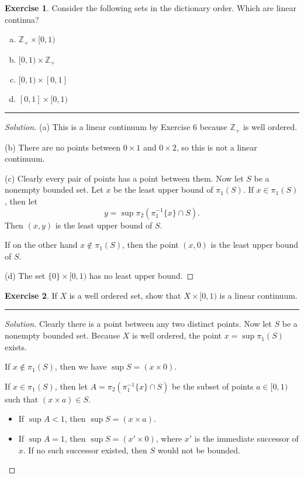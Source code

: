 \documentclass{article}
\theoremstyle{definition}
\newtheorem{exercise}{Exercise}[section]
\begin{document}
\begin{exercise}
  Consider the following sets in the dictionary order. Which are linear continua?
  \begin{enumerate}[(a)]
    \item $\mathbb{Z}_+\times [0,1)$
    \item $[0,1)\times\mathbb{Z}_+$
    \item $[0,1)\times[0,1]$
    \item $[0,1]\times[0,1)$
  \end{enumerate}
\end{exercise}
\hrule
\begin{proof}[Solution]
  (a) This is a linear continuum by Exercise 6 because $\mathbb{Z}_+$ is well ordered.

  (b) There are no points between $0\times 1$ and $0\times 2$, so this is not a linear continuum.

  (c) Clearly every pair of points has a point between them. Now let $S$ be a nonempty bounded set. Let $x$ be the least upper bound of $\pi_1(S)$. If $x\in\pi_1(S)$, then let
  $$y = \sup\pi_2(\pi_1^{-1}\{x\}\cap S).$$
  Then $(x,y)$ is the least upper bound of $S$.

  If on the other hand $x\notin\pi_1(S)$, then the point $(x,0)$ is the least upper bound of $S$.

  (d) The set $\{0\}\times [0,1)$ has no least upper bound.
\end{proof}

\pagebreak

\begin{exercise}
  If $X$ is a well ordered set, show that $X\times [0,1)$ is a linear continuum.
\end{exercise}
\hrule
\begin{proof}[Solution]
  Clearly there is a point between any two distinct points. Now let $S$ be a nonempty bounded set. Because $X$ is well ordered, the point $x = \sup\pi_1(S)$ exists.

  If $x\notin \pi_1(S)$, then we have $\sup S = (x\times 0)$.

  If $x\in\pi_1(S)$, then let $A = \pi_2(\pi_1^{-1}\{x\}\cap S)$ be the subset of points $a\in [0,1)$ such that $(x\times a)\in S$.
  \begin{itemize}
    \item If $\sup A < 1$, then $\sup S = (x\times a)$.
    \item If $\sup A = 1$, then $\sup S = (x'\times 0)$, where $x'$ is the immediate successor of $x$. If no such successor existed, then $S$ would not be bounded.
  \end{itemize}
\end{proof}
\end{document}

